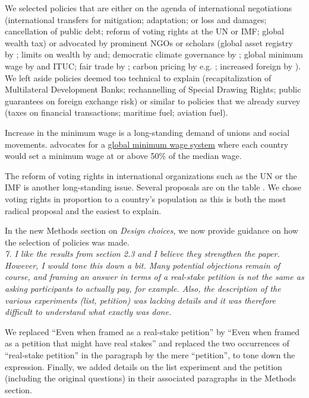\documentclass[12pt,english]{article}
\begin{document}
We selected policies that are either on the agenda of international negotiations (international transfers for mitigation; adaptation; or loss and damages; cancellation of public debt; reform of voting rights at the UN or IMF; global wealth tax) or advocated by prominent NGOs or scholars (global asset registry by \citet{icrict_roadmap_2020}; limits on wealth by \citet{robeyns_limitarianism_2024} and\citet{piketty_brief_2022}; democratic climate governance by \citet{dryzek_global_2011}; global minimum wage by \citet{palley_financial_2013} and ITUC; %
fair trade by \citet{hickel_divide_2017}; carbon pricing by e.g. \citet{cramton_global_2017}; increased foreign by \citet{concord_aid_2019}). 
We left aside policies deemed too technical to explain (recapitalization of Multilateral Development Banks; rechannelling of Special Drawing Rights; public guarantees on foreign exchange risk) or similar to policies that we already survey (taxes on financial transactions; maritime fuel; aviation fuel). 

Increase in the minimum wage is a long-standing demand of unions and social movements. \citet{palley_financial_2013} advocates for a \href{https://www.ft.com/content/fa0af8ca-345a-318b-8850-d8d93e61feaa}{global minimum wage system} where each country would set a minimum wage at or above 50\% of the median wage. 

The reform of voting rights in international organizations such as the UN or the IMF is another long-standing issue. Several proposals are on the table \citep{woodward_imf_2007}. We chose voting rights in proportion to a country's population as this is both the most radical proposal and the easiest to explain. 

In the new Methods section on \textit{Design choices}, we now provide guidance on how the selection of policies was made. 
~\\

\textit{7. I like the results from section 2.3 and I believe they strengthen the paper. However, I would tone this down a bit. Many potential objections remain of course, and framing an answer in terms of a real-stake petition is not the same as asking participants to actually pay, for example. Also, the description of the various experiments (list, petition) was lacking details and it was therefore difficult to understand what exactly was done.}

We replaced ``Even when framed as a real-stake petition'' by ``Even when framed as a petition that might have real stakes'' and replaced the two occurrences of ``real-stake petition'' in the paragraph by the mere ``petition'', to tone down the expression. Finally, we added details on the list experiment and the petition (including the original questions) in their associated paragraphs in the Methods section.
~\\
\end{document}
